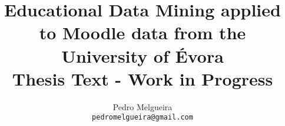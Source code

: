 \documentclass[12pt]{report}
\title{Educational Data Mining applied to Moodle data from the University of
Évora
\\
\large Thesis Text - Work in Progress}
\author{Pedro Melgueira\\
    \small{\texttt{pedromelgueira@gmail.com}}
}
\date{}
\begin{document}
\maketitle

\tableofcontents
\listoffigures
\listoftables






\printglossary



\end{document}
